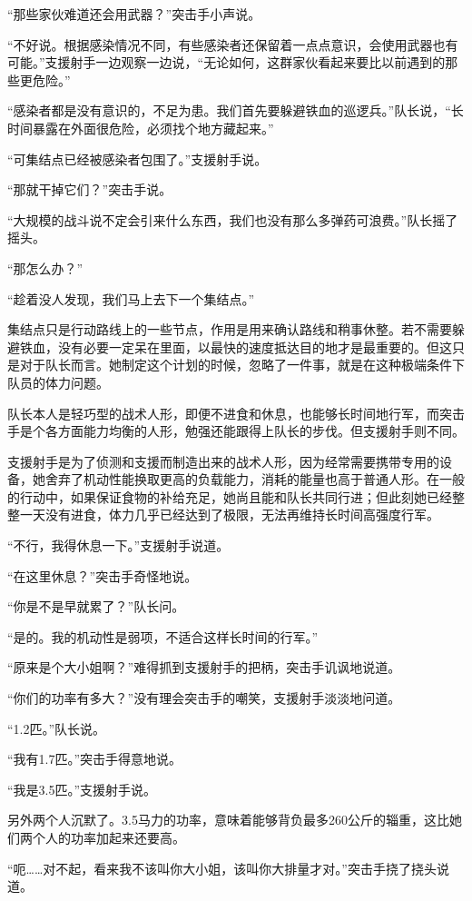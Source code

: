 “那些家伙难道还会用武器？”突击手小声说。

“不好说。根据感染情况不同，有些感染者还保留着一点点意识，会使用武器也有可能。”支援射手一边观察一边说，“无论如何，这群家伙看起来要比以前遇到的那些更危险。”

“感染者都是没有意识的，不足为患。我们首先要躲避铁血的巡逻兵。”队长说，“长时间暴露在外面很危险，必须找个地方藏起来。”

“可集结点已经被感染者包围了。”支援射手说。

“那就干掉它们？”突击手说。

“大规模的战斗说不定会引来什么东西，我们也没有那么多弹药可浪费。”队长摇了摇头。

“那怎么办？”

“趁着没人发现，我们马上去下一个集结点。”

集结点只是行动路线上的一些节点，作用是用来确认路线和稍事休整。若不需要躲避铁血，没有必要一定呆在里面，以最快的速度抵达目的地才是最重要的。但这只是对于队长而言。她制定这个计划的时候，忽略了一件事，就是在这种极端条件下队员的体力问题。

队长本人是轻巧型的战术人形，即便不进食和休息，也能够长时间地行军，而突击手是个各方面能力均衡的人形，勉强还能跟得上队长的步伐。但支援射手则不同。

支援射手是为了侦测和支援而制造出来的战术人形，因为经常需要携带专用的设备，她舍弃了机动性能换取更高的负载能力，消耗的能量也高于普通人形。在一般的行动中，如果保证食物的补给充足，她尚且能和队长共同行进；但此刻她已经整整一天没有进食，体力几乎已经达到了极限，无法再维持长时间高强度行军。

“不行，我得休息一下。”支援射手说道。

“在这里休息？”突击手奇怪地说。

“你是不是早就累了？”队长问。

“是的。我的机动性是弱项，不适合这样长时间的行军。”

“原来是个大小姐啊？”难得抓到支援射手的把柄，突击手讥讽地说道。

“你们的功率有多大？”没有理会突击手的嘲笑，支援射手淡淡地问道。

“1.2匹。”队长说。

“我有1.7匹。”突击手得意地说。

“我是3.5匹。”支援射手说。

另外两个人沉默了。3.5马力的功率，意味着能够背负最多260公斤的辎重，这比她们两个人的功率加起来还要高。

“呃……对不起，看来我不该叫你大小姐，该叫你大排量才对。”突击手挠了挠头说道。

